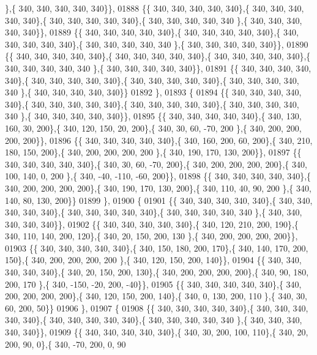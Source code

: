 \begin{DoxyCode}
      \},\{ 340, 340, 340, 340, 340\}\},
01888 \{\{ 340, 340, 340, 340, 340\},\{ 340, 340, 340, 340, 340\},\{ 340, 340, 340, 340, 340\},\{ 340, 340, 340, 340, 340
      \},\{ 340, 340, 340, 340, 340\}\},
01889 \{\{ 340, 340, 340, 340, 340\},\{ 340, 340, 340, 340, 340\},\{ 340, 340, 340, 340, 340\},\{ 340, 340, 340, 340, 340
      \},\{ 340, 340, 340, 340, 340\}\},
01890 \{\{ 340, 340, 340, 340, 340\},\{ 340, 340, 340, 340, 340\},\{ 340, 340, 340, 340, 340\},\{ 340, 340, 340, 340, 340
      \},\{ 340, 340, 340, 340, 340\}\},
01891 \{\{ 340, 340, 340, 340, 340\},\{ 340, 340, 340, 340, 340\},\{ 340, 340, 340, 340, 340\},\{ 340, 340, 340, 340, 340
      \},\{ 340, 340, 340, 340, 340\}\}
01892 \},
01893 \{
01894 \{\{ 340, 340, 340, 340, 340\},\{ 340, 340, 340, 340, 340\},\{ 340, 340, 340, 340, 340\},\{ 340, 340, 340, 340, 340
      \},\{ 340, 340, 340, 340, 340\}\},
01895 \{\{ 340, 340, 340, 340, 340\},\{ 340, 130, 160,  30, 200\},\{ 340, 120, 150,  20, 200\},\{ 340,  30,  60, -70, 200
      \},\{ 340, 200, 200, 200, 200\}\},
01896 \{\{ 340, 340, 340, 340, 340\},\{ 340, 160, 200,  60, 200\},\{ 340, 210, 180, 150, 200\},\{ 340, 200, 200, 200, 200
      \},\{ 340, 190, 170, 130, 200\}\},
01897 \{\{ 340, 340, 340, 340, 340\},\{ 340,  30,  60, -70, 200\},\{ 340, 200, 200, 200, 200\},\{ 340, 100, 140,   0, 200
      \},\{ 340, -40, -110, -60, 200\}\},
01898 \{\{ 340, 340, 340, 340, 340\},\{ 340, 200, 200, 200, 200\},\{ 340, 190, 170, 130, 200\},\{ 340, 110,  40,  90, 200
      \},\{ 340, 140,  80, 130, 200\}\}
01899 \},
01900 \{
01901 \{\{ 340, 340, 340, 340, 340\},\{ 340, 340, 340, 340, 340\},\{ 340, 340, 340, 340, 340\},\{ 340, 340, 340, 340, 340
      \},\{ 340, 340, 340, 340, 340\}\},
01902 \{\{ 340, 340, 340, 340, 340\},\{ 340, 120, 210, 200, 190\},\{ 340, 110, 140, 200, 120\},\{ 340,  20, 150, 200, 130
      \},\{ 340, 200, 200, 200, 200\}\},
01903 \{\{ 340, 340, 340, 340, 340\},\{ 340, 150, 180, 200, 170\},\{ 340, 140, 170, 200, 150\},\{ 340, 200, 200, 200, 200
      \},\{ 340, 120, 150, 200, 140\}\},
01904 \{\{ 340, 340, 340, 340, 340\},\{ 340,  20, 150, 200, 130\},\{ 340, 200, 200, 200, 200\},\{ 340,  90, 180, 200, 170
      \},\{ 340, -150, -20, 200, -40\}\},
01905 \{\{ 340, 340, 340, 340, 340\},\{ 340, 200, 200, 200, 200\},\{ 340, 120, 150, 200, 140\},\{ 340,   0, 130, 200, 110
      \},\{ 340,  30,  60, 200,  50\}\}
01906 \},
01907 \{
01908 \{\{ 340, 340, 340, 340, 340\},\{ 340, 340, 340, 340, 340\},\{ 340, 340, 340, 340, 340\},\{ 340, 340, 340, 340, 340
      \},\{ 340, 340, 340, 340, 340\}\},
01909 \{\{ 340, 340, 340, 340, 340\},\{ 340,  30, 200, 100, 110\},\{ 340,  20, 200,  90,   0\},\{ 340, -70, 200,   0,  90

\end{DoxyCode}
